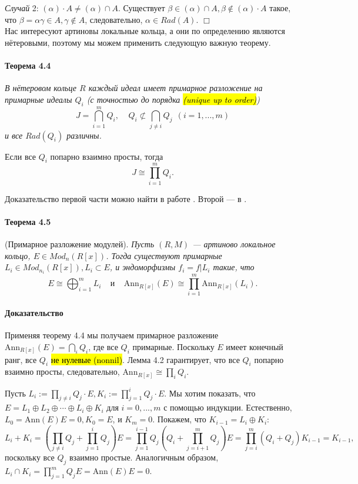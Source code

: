\documentclass[a4paper,12pt]{article}
\newcommand{\Ann}{\text{Ann}}
\begin{document}
\textit{Случай} 2: $(\alpha) \cdot A \ne (\alpha) \cap A$. Существует $\beta \in (\alpha) \cap A, \beta \notin (\alpha) \cdot A$ такое, что $\beta = \alpha \gamma \in A, \gamma \notin A$, следовательно, $\alpha \in Rad(A)$. $\Box$ \\

Нас интересуют артиновы локальные кольца, а они по определению являются нётеровыми, поэтому мы можем применить следующую важную теорему.

\paragraph{Теорема 4.4}
{\itshape
В нётеровом кольце $R$ каждый идеал имеет примарное разложение на примарные идеалы $Q_i$ (с точностью до порядка \hl{(unique up to order)})
$$
J = \bigcap_{i=1}^{m} Q_i, ~~~~~ Q_i \not \subset \bigcap_{j \ne i} Q_j ~~ (i = 1, ..., m)
$$
и все $Rad(Q_i)$ различны.

Если все $Q_i$ попарно взаимно просты, тогда
$$
J \cong \prod_{i=1}^{m} Q_i.
$$
}

Доказательство первой части можно найти в работе \cite{bib3}. Второй --- в \cite{bib13}.

\paragraph{Теорема 4.5}
(Примарное разложение модулей). {\itshape
Пусть $(R, M)$ --- артиново локальное кольцо, $E \in Mod_n (R[x])$. Тогда существуют примарные $L_i \in Mod_{n_i}(R[x]), L_i \subset E$, и эндоморфизмы $f_i = f|L_i$ такие, что
$$
E \cong \bigoplus_{i=1}^m L_i ~~~~~ \textit{и} ~~~~~ \Ann_{R[x]}(E) \cong \prod_{i=1}^{m} \Ann_{R[x]} (L_i).
$$
}

\paragraph{Доказательство}
Применяя теорему 4.4 мы получаем примарное разложение $\Ann_{R[x]} (E) = \bigcap_{i} Q_i$, где все $Q_i$ примарные. Поскольку $E$ имеет конечный ранг, все $Q_i$ \hl{не нулевые (nonnil)}. Лемма 4.2 гарантирует, что все $Q_i$ попарно взаимно просты, следовательно, $\Ann_{R[x]} \cong \prod_{i} Q_i$.

Пусть $L_i := \prod_{j \ne i} Q_j \cdot E, K_i := \prod_{j=1}^{i} Q_j \cdot E$. Мы хотим показать, что $E = L_1 \oplus L_2 \oplus \cdots \oplus L_i \oplus K_i$ для $i = 0, ..., m$ с помощью индукции.
Естественно, $L_0 = \Ann(E) E = 0, K_0 = E$, и $K_m = 0$. Покажем, что $K_{i-1} = L_i \oplus K_i$:
$$
L_i + K_i = \left( \prod_{j \ne i} Q_j + \prod_{j=1}^{i}Q_j\right) E = \prod_{j = 1}^{i - 1}Q_j \left( Q_i + \prod_{j = i+1}^{m} Q_j \right) E = \prod_{j = i}^{m} (Q_i + Q_j) K_{i-1} = K_{i-1},
$$
поскольку все $Q_j$ взаимно простые. Аналогичным образом, $L_i \cap K_i = \prod_{j=1}^{m} Q_j E = \Ann(E) E = 0$.
\end{document}
